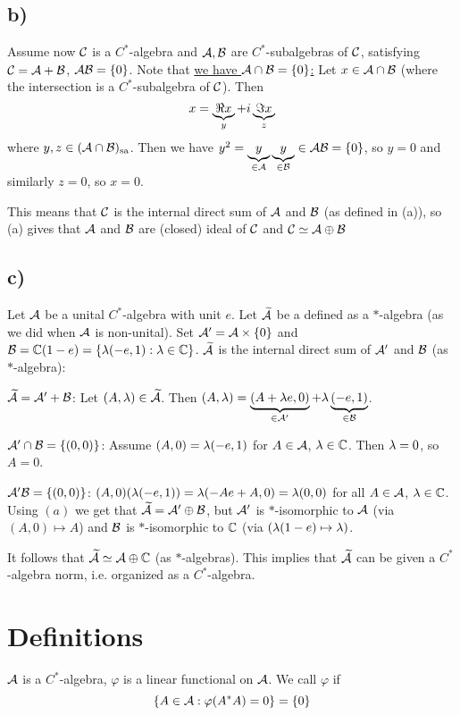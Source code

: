 \documentclass[10pt,english,a4paper]{article}
\theoremstyle{definition}
\let\emph\relax %
\def\tAs{\widetilde{\As}}
\def\vphi{\varphi}
\begin{document}
\subsection*{b)}
Assume now $\mathcal{C}$ is a $C^*$-algebra and $\mathcal{A},\mathcal{B}$ are $C^*$-subalgebras 
of $\mathcal{C}$, satisfying $\mathcal{C} = \mathcal{A} + \mathcal{B}$, $\mathcal{A}\mathcal{B} = \{0\}$. 
Note that \ul{we have $\mathcal{A} \cap \mathcal{B} =  \{0\}$:}
Let $x \in \mathcal{A} \cap \mathcal{B}$ (where the intersection is a  $C^*$-subalgebra of $\mathcal{C}$). 
Then 
 \[  x = \underbrace{\Re x}_{y} + i \underbrace{\Im x}_{z} \]
where $y,z \in (\mathcal{A} \cap \mathcal{B})_{\text{sa}}$.
Then we have $y^2 =\underbrace{y}_{\in \mathcal{A}} \underbrace{y}_{\in \mathcal{B}} \in \mathcal{A}\mathcal{B} = \{0\}$, 
so $y=0$ and similarly $z = 0$, so $x =0$.


This means that $\mathcal{C}$ is the internal direct sum of $\mathcal{A}$ and $\mathcal{B}$ (as defined in (a)), 
so (a) gives that $\mathcal{A}$ and $\mathcal{B}$ are (closed) ideal of $\mathcal{C}$ and $\mathcal{C}\simeq \mathcal{A} \oplus \mathcal{B}$

\subsection*{c)}
Let $\mathcal{A}$ be a unital $C^*$-algebra with unit $e$. Let $\tAs$ be a defined as a $*$-algebra
(as we did when $\mathcal{A}$ is non-unital). Set $\mathcal{A}' = \mathcal{A}\times \{0\}$ and $\mathcal{B} = \mathbb{C}(1-e) =
\{\lambda (-e, 1): \lambda \in \mathbb{C}\}$. $\tAs$ is the internal direct sum of $\mathcal{A}'$ and 
$\mathcal{B}$ (as $*$-algebra): 

$\tAs = \As' + \Bs$: Let $(A, \la ) \in \tAs$. Then $(A,\lambda) = \underbrace{(A + \lambda e, 0)}_{\in \mathcal{A}'} 
+ \lambda \underbrace{(-e,1)}_{\in \mathcal{B}}$.

$\mathcal{A}'\cap \mathcal{B} = \{(0,0)\}$: Assume $(A,0) = \lambda (-e,1)$ for $A \in \mathcal{A}$, 
$\lambda \in \mathbb{C}$. Then $\lambda = 0$, so $A =0$.

$\mathcal{A}'\mathcal{B} = \{(0,0)\}$: $(A, 0)(\lambda(-e,1)) = \lambda(-Ae+A,0) = \lambda (0,0)$ for all 
$A \in \mathcal{A}$, $\lambda \in \mathbb{C}$.
Using $(a)$ we get that $\tAs = \As'\oplus \Bs$, but $\mathcal{A}'$ is $*$-isomorphic to 
$\mathcal{A}$ (via $(A,0)\mapsto A$) and $\mathcal{B}$ is $*$-isomorphic
to $\mathbb{C}$ (via $(\lambda(1-e) \mapsto \lambda)$.

It follows that $\tAs \simeq \As \oplus \C$
(as $*$-algebras). This implies that $\tAs$ can be given a $C^*$-algebra norm, i.e.
organized as a $C^*$-algebra. 

\section*{Definitions}
$\mathcal{A}$ is a $C^{*}$-algebra, $\vphi$ is a linear functional on $\mathcal{A}$. We call $\vphi$
\emph{faithful} if 
\[ \{A \in \As : \vphi(A^*A) = 0\} = \{0\} \] 
\end{document}

